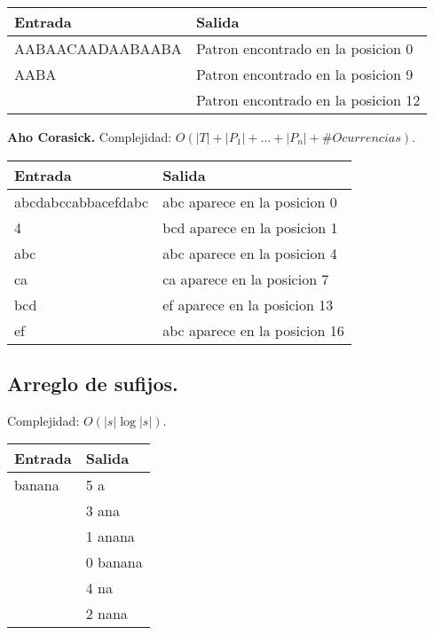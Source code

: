\documentclass[10pt, letterpaper, twoside]{article}
\begin{document}
\begin{tabular}{|p{7cm}|p{7cm}|}
\hline
\textbf{Entrada} & \textbf{Salida}\\ \hline
AABAACAADAABAABA & Patron encontrado en la posicion 0\\
AABA             & Patron encontrado en la posicion 9\\
                 & Patron encontrado en la posicion 12\\ \hline
\end{tabular}\bigskip

\textbf{Aho Corasick.} Complejidad: $O(|T| + |P_1| + \ldots + |P_n| + \#Ocurrencias)$.



\begin{tabular}{|p{7cm}|p{7cm}|}
\hline
\textbf{Entrada} & \textbf{Salida}\\ \hline
abcdabccabbacefdabc & abc aparece en la posicion 0\\
4                   & bcd aparece en la posicion 1\\
abc                 & abc aparece en la posicion 4\\
ca                  & ca aparece en la posicion 7\\
bcd                 & ef aparece en la posicion 13\\
ef                  & abc aparece en la posicion 16\\ \hline
\end{tabular}

\subsection{Arreglo de sufijos.}

Complejidad: $O(|s|\log |s|)$.



\begin{tabular}{|p{7cm}|p{7cm}|}
\hline
\textbf{Entrada} & \textbf{Salida}\\ \hline
banana & 5 a\\
& 3 ana\\
& 1 anana\\
& 0 banana\\
& 4 na\\
& 2 nana\\ \hline
\end{tabular}

\newpage
\end{document}
